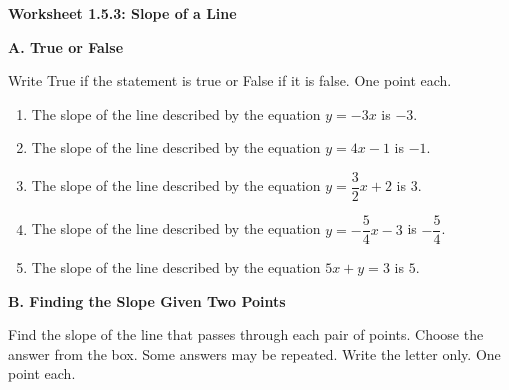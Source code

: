

\def \Lesson {Slope of a Line}
\def \LessonCode {1.5.3}


	\begin{center}
		\textbf{\large Worksheet \LessonCode: \Lesson}
	\end{center}

    \vspace*{2em}

    \noindent \textbf{A. True or False} 
    
    Write True if the statement is true or False if it is false. One point each.
    
    \begin{enumerate}
    	\item The slope of the line described by the equation $ y = -3x $ is $ -3 $.
    	\item The slope of the line described by the equation $ y = 4x - 1 $ is $ -1 $.
    	\item The slope of the line described by the equation $ y = \dfrac{3}{2}x + 2 $ is $ 3 $.
    	\item The slope of the line described by the equation $ y = -\dfrac{5}{4}x - 3 $ is $ -\dfrac{5}{4} $.
    	\item The slope of the line described by the equation $ 5x + y = 3 $ is $ 5 $.
    \end{enumerate}

    \vspace*{1.3ex}

    \noindent \textbf{B. Finding the Slope Given Two Points} 
    
    Find the slope of the line that passes through each pair of points. Choose the answer from the box. Some answers may be repeated. Write the letter only. One point each.
    
    \begin{center}  
    \end{center}
        
